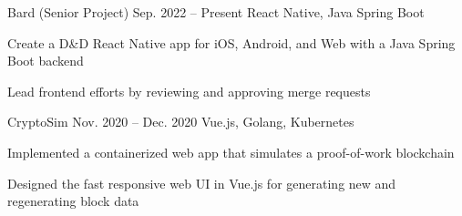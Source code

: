 \fontdir[fonts/]

\begin{cvprojects}

  \cvproject
  {Bard (Senior Project)}
  {\href{https://gitlab.com/drexel_se/senior_project/ay22_bard/bard}{\faGithubSquare\acvHeaderIconSep\@KevinIsMyName}}
  {Sep. 2022 -- Present}
  {React Native, Java Spring Boot}
  {
    \begin{cvitems}
      \item Create a D\&D React Native app for iOS, Android, and Web with a Java Spring Boot backend
      \item Lead frontend efforts by reviewing and approving merge requests
    \end{cvitems}
  }



  \cvproject
  {CryptoSim}
  {\href{https://github.com/jzlotek/bc}{\faGithubSquare\acvHeaderIconSep\@KevinIsMyName}}
  {Nov. 2020 -- Dec. 2020}
  {Vue.js, Golang, Kubernetes}
  {
    \begin{cvitems}
      \item Implemented a containerized web app that simulates a proof-of-work blockchain
      \item Designed the fast responsive web UI in Vue.js for generating new and regenerating block data
    \end{cvitems}
  }



\end{cvprojects}
